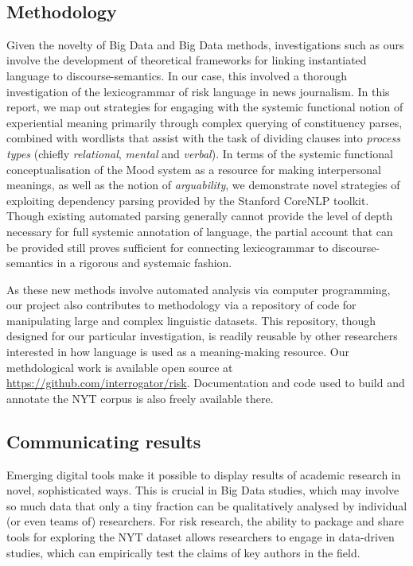 ~\ 

\subsection{Methodology}

Given the novelty of Big Data and Big Data methods, investigations such as ours involve the development of theoretical frameworks for linking instantiated language to discourse-semantics. In our case, this involved a thorough investigation of the lexicogrammar of risk language in news journalism. In this report, we map out strategies for engaging with the systemic functional notion of experiential meaning primarily through complex querying of constituency parses, combined with wordlists that assist with the task of dividing clauses into \emph{process types} (chiefly \emph{relational}, \emph{mental} and \emph{verbal}). In terms of the systemic functional conceptualisation of the Mood system as a resource for making interpersonal meanings, as well as the notion of \emph{arguability}, we demonstrate novel strategies of exploiting dependency parsing provided by the Stanford CoreNLP toolkit. Though existing automated parsing generally cannot provide the level of depth necessary for full systemic annotation of language, the partial account that can be provided still proves sufficient for connecting lexicogrammar to discourse-semantics in a rigorous and systemaic fashion.

As these new methods involve automated analysis via computer programming, our project also contributes to methodology via a repository of code for manipulating large and complex linguistic datasets. This repository, though designed for our particular investigation, is readily reusable by other researchers interested in how language is used as a meaning-making resource. Our methdological work is available open source at \url{https://github.com/interrogator/risk}. Documentation and code used to build and annotate the NYT corpus is also freely available there.

\subsection{Communicating results}

Emerging digital tools make it possible to display results of academic research in novel, sophisticated ways. This is crucial in Big Data studies, which may involve so much data that only a tiny fraction can be qualitatively analysed by individual (or even teams of) researchers. For risk research, the ability to package and share tools for exploring the NYT dataset allows researchers to engage in data-driven studies, which can empirically test the claims of key authors in the field.

